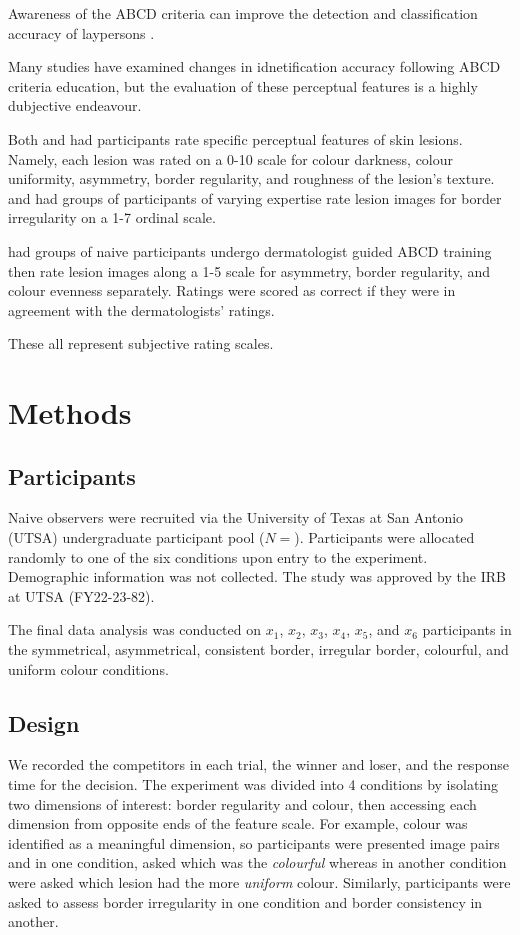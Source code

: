 \documentclass[a4paper, natbib, doc, 12pt]{apa7}
\begin{document}
Awareness of the ABCD criteria can improve the detection and classification accuracy of laypersons \citep{robinson2006skills}.

Many studies have examined changes in idnetification accuracy following ABCD criteria education, but the evaluation of these perceptual features is a highly dubjective endeavour. 

Both \cite{zanotto2011visual} and \cite{laskaris2010fuzzy} had participants rate specific perceptual features of skin lesions. Namely, each lesion was rated on a 0-10 scale for colour darkness, colour uniformity, asymmetry, border regularity, and roughness of the lesion's texture. \cite{gunasti2008interrater} and \cite{} had groups of participants of varying expertise rate lesion images for border irregularity on a 1-7 ordinal scale. 

\cite{robinson2006skills} had groups of naive participants undergo dermatologist guided ABCD training then rate lesion images along a 1-5 scale for asymmetry, border regularity, and colour evenness separately. Ratings were scored as correct if they were in agreement with the dermatologists' ratings.


These all represent subjective rating scales.

\section{Methods}
\subsection{Participants}
Naive observers were recruited via the University of Texas at San Antonio (UTSA) undergraduate participant pool ($N= $). Participants were allocated randomly to one of the six conditions upon entry to the experiment. Demographic information was not collected. The study was approved by the IRB at UTSA (FY22-23-82). 

The final data analysis was conducted on $x_{1}$, $x_{2}$, $x_{3}$, $x_{4}$, $x_{5}$, and $x_{6}$ participants in the symmetrical, asymmetrical,  consistent border, irregular border, colourful, and uniform colour conditions. 

\subsection{Design}
We recorded the competitors in each trial, the winner and loser, and the response time for the decision. The experiment was divided into 4 conditions by isolating two dimensions of interest: border regularity and colour, then accessing each dimension from opposite ends of the feature scale. For example, colour was identified as a meaningful dimension, so participants were presented image pairs and in one condition, asked which was the \textit{colourful} whereas in another condition were asked which lesion had the more \textit{uniform} colour. Similarly, participants were asked to assess border irregularity in one condition and border consistency in another.
\
\end{document}
